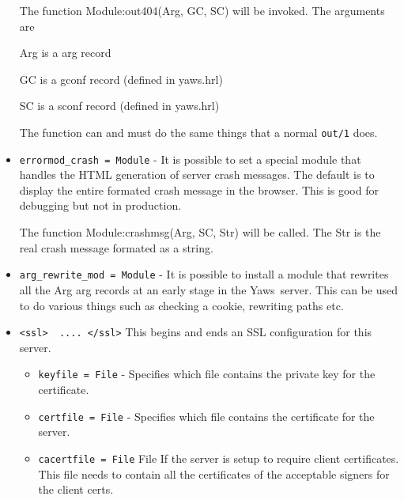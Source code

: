 \documentclass[11pt,oneside,english]{book}
\newcommand{\Yaws}            %
        {{\sc Yaws}}
\begin{document}
\begin{itemize}
              The function Module:out404(Arg, GC, SC) will
              be invoked. The arguments are

              Arg is a arg{} record

              GC  is  a  gconf{}   record   (defined   in
              yaws.hrl)

              SC   is   a   sconf{}  record  (defined  in
              yaws.hrl)

              The function can and must do the same things
              that a normal \verb+out/1+ does.

\item       \verb+errormod_crash = Module+ -
              It  is possible to set a special module that
              handles the HTML generation of server  crash
              messages.  The  default  is  to  display the
              entire  formated  crash   message   in   the
              browser.  This is good for debugging but not
              in production.

              The function Module:crashmsg(Arg,  SC,  Str)
              will  be  called.  The Str is the real crash
              message formated as a string.

\item       \verb+arg_rewrite_mod = Module+ -
              It is possible  to  install  a  module  that
              rewrites  all  the  Arg arg{} records at an
              early stage in the \Yaws\  server.  This can be
              used to do various things such as checking a
              cookie, rewriting paths etc.


\item        \verb+<ssl>  .... </ssl>+
              This begins and ends  an  SSL  configuration
              for this server.
\begin{itemize}
\item        \verb+keyfile = File+ -
              Specifies  which  file  contains the private
              key for the certificate.

\item        \verb+certfile = File+ -
              Specifies which file contains  the  certificate for the server.

\item        \verb+cacertfile = File+
              File  If  the  server  is  setup  to require
              client certificates. This file needs to contain
              all the certificates of the acceptable
              signers for the client certs.


\end{itemize}
\end{itemize}
\end{document}
